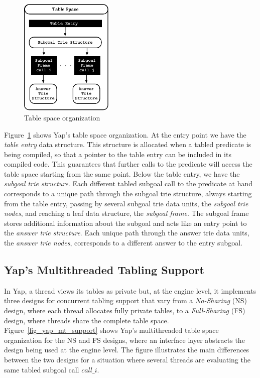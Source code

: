 \documentclass{llncs}
\begin{document}
\begin{figure}
\vspace{-\intextsep}
\centering
\includegraphics[width=4.5cm]{figures/table_space.pdf}
\caption{Table space organization}
\label{fig_table_space}
\vspace{-\intextsep}
\end{figure}

Figure~\ref{fig_table_space} shows Yap's table space organization. At
the entry point we have the \emph{table entry} data structure. This
structure is allocated when a tabled predicate is being compiled, so
that a pointer to the table entry can be included in its compiled
code. This guarantees that further calls to the predicate will access
the table space starting from the same point. Below the table entry,
we have the \emph{subgoal trie structure}. Each different tabled
subgoal call to the predicate at hand corresponds to a unique path
through the subgoal trie structure, always starting from the table
entry, passing by several subgoal trie data units, the \emph{subgoal
  trie nodes}, and reaching a leaf data structure, the \emph{subgoal
  frame}. The subgoal frame stores additional information about the
subgoal and acts like an entry point to the \emph{answer trie
  structure}. Each unique path through the answer trie data units, the
\emph{answer trie nodes}, corresponds to a different answer to the
entry subgoal.


\subsection{Yap's Multithreaded Tabling Support}

In Yap, a thread views its tables as private but, at the engine level,
it implements three designs for concurrent tabling support that vary
from a \emph{No-Sharing} (NS) design, where each thread allocates
fully private tables, to a \emph{Full-Sharing} (FS) design, where
threads share the complete table
space. Figure~\ref{fig_yap_mt_support} shows Yap's multithreaded table
space organization for the NS and FS designs, where an interface layer
abstracts the design being used at the engine level. The figure
illustrates the main differences between the two designs for a
situation where several threads are evaluating the same tabled subgoal
call $call\_i$.
\end{document}
